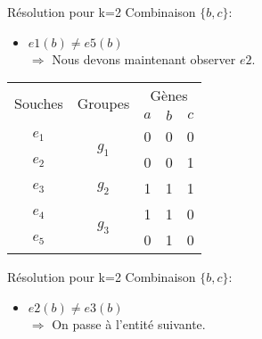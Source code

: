 \begin{overprint}
{			\begin{minipage}[r]{0.46\linewidth}
				\begin{block}{Résolution pour k=2}
					Combinaison $\{b,c\}$:
					\begin{itemize}
						\item $e1(b) \not = e5(b) $ \\ $\Rightarrow$ Nous devons maintenant observer $e2$.
					\end{itemize}
				\end{block}
			\end{minipage}
		}
		{
			\begin{minipage}[l]{0.46\linewidth}
				\begin{center}
					\begin{tabular}{|c||c|c|c|c|}
						\hline
						\multirow{2}{*}{Souches}&\multirow{2}{*}{Groupes}&\multicolumn{3}{c|}{Gènes
						}\\
						&&$a$&\cellcolor{blue!75}$b$&\cellcolor{blue!75}$c$\\
						\hline
						\hline
						$e_1$&\multirow{2}{*}{$g_1$}& 0 & 0 & 0\\
						\cline{1-1} \cline{3-5}
						$e_2$&& 0 & \cellcolor{cyan}0 & 1\\
						\hline
						\hline
						$e_3$&$g_2$& 1 & \cellcolor{cyan}1 & 1\\
						\hline
						\hline
						$e_4$&\multirow{2}{*}{$g_3$}& 1 & 1 & 0\\
						\cline{1-1} \cline{3-5}
						$e_5$&& 0 & 1 & 0\\
						\hline
					\end{tabular}
				\end{center}
			\end{minipage}
			\hspace{0.6cm}
			\begin{minipage}[r]{0.46\linewidth}
				\begin{block}{Résolution pour k=2}
					Combinaison $\{b,c\}$:
					\begin{itemize}
						\item $e2(b) \not = e3(b) $ \\ $\Rightarrow$ On passe à l'entité suivante.
					\end{itemize}
				\end{block}
			\end{minipage}
		}
		{
			\begin{minipage}[l]{0.46\linewidth}
				\begin{center}

\end{center}
\end{minipage}}
\end{overprint}

